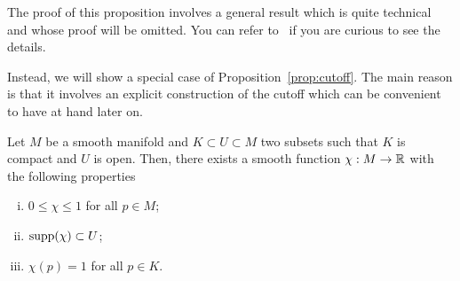 The proof of this proposition involves a general result which is quite technical and whose proof will be omitted.
You can refer to~\cite{book:lee, book:tu} if you are curious to see the details.

Instead, we will show a special case of Proposition~\ref{prop:cutoff}. The main reason is that it involves an explicit construction of the cutoff which can be convenient to have at hand later on.

\begin{lemma}
  Let $M$ be a smooth manifold and $K\subset U\subset M$ two subsets such that $K$ is compact and $U$ is open.
  Then, there exists a smooth function $\chi: M \to\mathbb{R}$ with the following properties
  \begin{enumerate}[(i)]
    \item $0 \leq \chi \leq 1$ for all $p\in M$;
    \item $\operatorname{supp}(\chi)\subset U$;
    \item $\chi(p) = 1$ for all $p\in K$.
  \end{enumerate}
\end{lemma}
